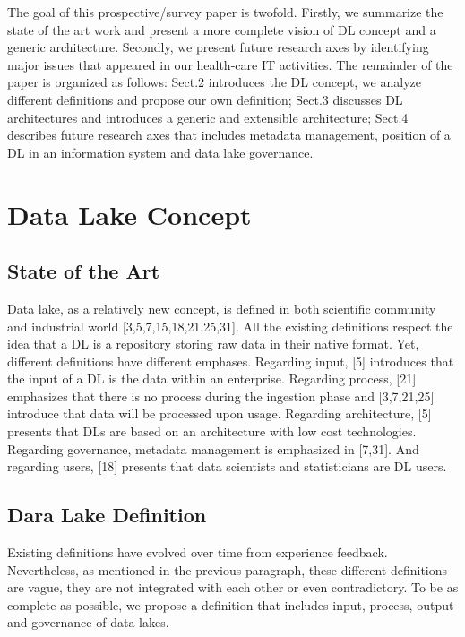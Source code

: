\documentclass[a4paper,12pt,notitlepage,twoside,openright]{article}
\begin{document}
The goal of this prospective/survey paper is twofold. Firstly, we
summarize the state of the art work and present a more complete vision
of DL concept and a generic architecture. Secondly, we present future
research axes by identifying major issues that appeared in our
health-care IT activities. The remainder of the paper is organized as
follows: Sect.2 introduces the DL concept, we analyze different
definitions and propose our own definition; Sect.3 discusses DL
architectures and introduces a generic and extensible architecture;
Sect.4 describes future research axes that includes metadata management,
position of a DL in an information system and data lake governance.

\hypertarget{data-lake-concept}{%
\section{Data Lake Concept}\label{data-lake-concept}}

\hypertarget{state-of-the-art}{%
\subsection{State of the Art}\label{state-of-the-art}}

Data lake, as a relatively new concept, is defined in both scientific
community and industrial world {[}3,5,7,15,18,21,25,31{]}. All the
existing definitions respect the idea that a DL is a repository storing
raw data in their native format. Yet, different definitions have
different emphases. Regarding input, {[}5{]} introduces that the input
of a DL is the data within an enterprise. Regarding process, {[}21{]}
emphasizes that there is no process during the ingestion phase and
{[}3,7,21,25{]} introduce that data will be processed upon usage.
Regarding architecture, {[}5{]} presents that DLs are based on an
architecture with low cost technologies. Regarding governance, metadata
management is emphasized in {[}7,31{]}. And regarding users, {[}18{]}
presents that data scientists and statisticians are DL users.

\hypertarget{dara-lake-definition}{%
\subsection{Dara Lake Definition}\label{dara-lake-definition}}

Existing definitions have evolved over time from experience feedback.
Nevertheless, as mentioned in the previous paragraph, these different
definitions are vague, they are not integrated with each other or even
contradictory. To be as complete as possible, we propose a definition
that includes input, process, output and governance of data lakes.
\end{document}
